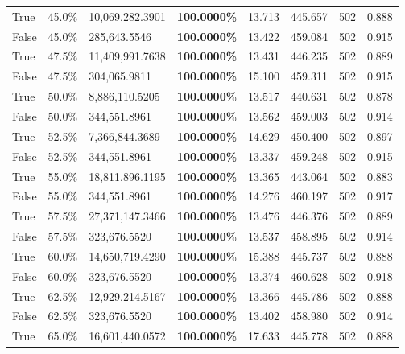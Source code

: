 \begin{table}[H]
{\begin{tabular}{lllrllll}
\cline{1-8}
True & 45.0\% & 10,069,282.3901 & \bfseries \color{red} 100.0000\% & 13.713 & 445.657 & 502 & 0.888 \\
\cline{1-8}
False & 45.0\% & 285,643.5546 & \bfseries \color{red} 100.0000\% & 13.422 & 459.084 & 502 & 0.915 \\
\cline{1-8}
True & 47.5\% & 11,409,991.7638 & \bfseries \color{red} 100.0000\% & 13.431 & 446.235 & 502 & 0.889 \\
\cline{1-8}
False & 47.5\% & 304,065.9811 & \bfseries \color{red} 100.0000\% & 15.100 & 459.311 & 502 & 0.915 \\
\cline{1-8}
True & 50.0\% & 8,886,110.5205 & \bfseries \color{red} 100.0000\% & 13.517 & 440.631 & 502 & 0.878 \\
\cline{1-8}
False & 50.0\% & 344,551.8961 & \bfseries \color{red} 100.0000\% & 13.562 & 459.003 & 502 & 0.914 \\
\cline{1-8}
True & 52.5\% & 7,366,844.3689 & \bfseries \color{red} 100.0000\% & 14.629 & 450.400 & 502 & 0.897 \\
\cline{1-8}
False & 52.5\% & 344,551.8961 & \bfseries \color{red} 100.0000\% & 13.337 & 459.248 & 502 & 0.915 \\
\cline{1-8}
True & 55.0\% & 18,811,896.1195 & \bfseries \color{red} 100.0000\% & 13.365 & 443.064 & 502 & 0.883 \\
\cline{1-8}
False & 55.0\% & 344,551.8961 & \bfseries \color{red} 100.0000\% & 14.276 & 460.197 & 502 & 0.917 \\
\cline{1-8}
True & 57.5\% & 27,371,147.3466 & \bfseries \color{red} 100.0000\% & 13.476 & 446.376 & 502 & 0.889 \\
\cline{1-8}
False & 57.5\% & 323,676.5520 & \bfseries \color{red} 100.0000\% & 13.537 & 458.895 & 502 & 0.914 \\
\cline{1-8}
True & 60.0\% & 14,650,719.4290 & \bfseries \color{red} 100.0000\% & 15.388 & 445.737 & 502 & 0.888 \\
\cline{1-8}
False & 60.0\% & 323,676.5520 & \bfseries \color{red} 100.0000\% & 13.374 & 460.628 & 502 & 0.918 \\
\cline{1-8}
True & 62.5\% & 12,929,214.5167 & \bfseries \color{red} 100.0000\% & 13.366 & 445.786 & 502 & 0.888 \\
\cline{1-8}
False & 62.5\% & 323,676.5520 & \bfseries \color{red} 100.0000\% & 13.402 & 458.980 & 502 & 0.914 \\
\cline{1-8}
True & 65.0\% & 16,601,440.0572 & \bfseries \color{red} 100.0000\% & 17.633 & 445.778 & 502 & 0.888 \\

\end{tabular}}
\end{table}

